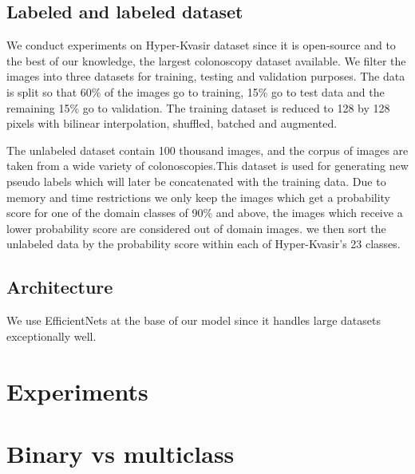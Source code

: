 \documentclass[thesis.tex]{subfiles}
\begin{document}
\subsection{Labeled and labeled dataset}
We conduct experiments on Hyper-Kvasir dataset since it is open-source and to the best of our knowledge, the largest colonoscopy dataset available. We filter the images into three datasets for training, testing and validation purposes. The data is split so that 60\% of the images go to training, 15\% go to test data and the remaining 15\% go to validation. The training dataset is reduced to 128 by 128 pixels with bilinear interpolation, shuffled, batched and augmented.

The unlabeled dataset contain 100 thousand images, and the corpus of images are taken from a wide variety of colonoscopies.This dataset is used for generating new pseudo labels which will later be concatenated with the training data. Due to memory and time restrictions we only keep the images which get a probability score for one of the domain classes of 90\% and above, the images which receive a lower probability score are considered out of domain images. we then sort the unlabeled data by the probability score within each of Hyper-Kvasir's 23 classes.



\subsection{Architecture}
We use EfficientNets at the base of our model since it handles large datasets exceptionally well. 




\section{Experiments}
%


\section{Binary vs multiclass}
\end{document}

